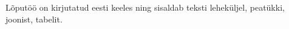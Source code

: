Lõputöö on kirjutatud eesti keeles ning sisaldab teksti  leheküljel,  peatükki,  joonist,  tabelit.

